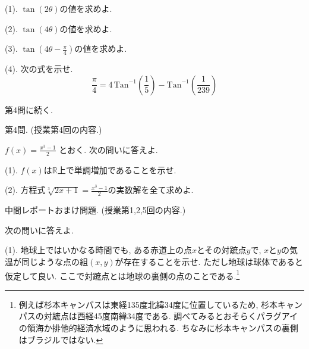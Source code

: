 \documentclass[dvipdfmx,a4paper,11pt]{article}
\newcommand{\R}{\mathbb{R}}
\newcommand{\Tan}{\text{Tan}^{-1}}
\theoremstyle{definition}
\begin{document}
 \vspace{11pt}
 
(1).  $\tan(2 \theta)$の値を求めよ.

    \vspace{11pt}
    
(2).  $\tan(4 \theta)$の値を求めよ.

\vspace{11pt}

(3).  $\tan(4 \theta - \frac{\pi}{4})$の値を求めよ.

\vspace{11pt}

(4).  次の式を示せ.
$$
\frac{\pi}{4} = 4 \, \Tan \left(\frac{1}{5} \right)-  \Tan \left( \frac{1}{239} \right)
$$

     \vspace{33pt} 
     
  \begin{flushright}
 {\LARGE 第4問に続く.}
 \end{flushright}
     
 \newpage
   
{\Large 第4問.} (授業第4回の内容.)
    \vspace{11pt}

 $
 f(x) = \frac{x^3 -1 }{2}
 $
 とおく. 次の問いに答えよ.
 
 \vspace{11pt}
 
 (1). $f(x)$は$\R$上で単調増加であることを示せ.
 
 \vspace{11pt}
 
 (2). 方程式$ \sqrt[3]{2x + 1} = \frac{x^3 - 1}{2}$の実数解を全て求めよ.
 
\vspace{33pt} 

{\Large 中間レポートおまけ問題.} (授業第1,2,5回の内容.)
\vspace{11pt}

次の問いに答えよ.

\vspace{11pt}

(1).
地球上ではいかなる時間でも, ある赤道上の点$x$とその対蹠点$y$で, $x$と$y$の気温が同じような点の組$(x,y)$が存在することを示せ.
ただし地球は球体であると仮定して良い.
ここで対蹠点とは地球の裏側の点のことである.\footnote{例えば杉本キャンパスは東経135度北緯34度に位置しているため, 杉本キャンパスの対蹠点は西経45度南緯34度である. 調べてみるとおそらくパラグアイの領海か排他的経済水域のように思われる. ちなみに杉本キャンパスの裏側はブラジルではない.}
\end{document}
